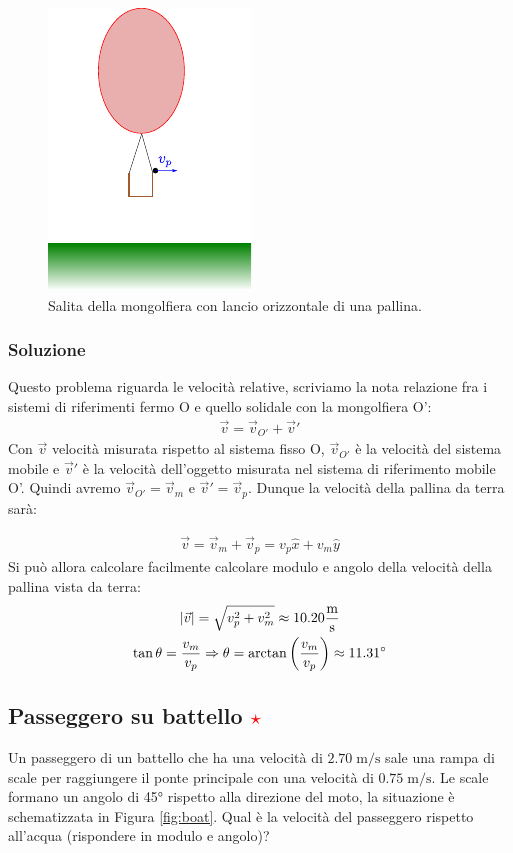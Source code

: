 \documentclass[12pt,a4paper]{book}
\newcommand{\rstar}{ \textcolor{red}{$\star$}}
\begin{document}
\begin{figure}[!ht]
\centering
\includegraphics[scale=1.5]{mongolfiera.pdf}
\caption{Salita della mongolfiera con lancio orizzontale di una pallina. \label{fig:mongolfiera} }
\end{figure}

\subsubsection*{Soluzione}
Questo problema riguarda le velocità relative, scriviamo la nota relazione fra i sistemi di riferimenti fermo O e quello solidale con la mongolfiera O':
%
\begin{gather*}
\vec{v}=\vec{v}_{O'}+\vec{v}'
\end{gather*}
%
Con $\vec{v}$ velocità misurata rispetto al sistema fisso O, $\vec{v}_{O'}$ è la velocità del sistema mobile e $\vec{v}'$ è la velocità dell'oggetto misurata nel sistema di riferimento mobile O'. Quindi avremo $\vec{v}_{O'}=\vec{v}_{m}$ e $\vec{v}'=\vec{v}_{p}$. Dunque la velocità della pallina da terra sarà:

%
\begin{gather*}
\vec{v}=\vec{v}_{m}+\vec{v}_{p}=v_p\hat{x}+v_m\hat{y}
\end{gather*}
%
Si può allora calcolare facilmente calcolare modulo e angolo della velocità della pallina vista da terra:
%
\begin{gather*}
\qty|\vec{v}|=\sqrt{v_p^2+v_m^2}\approx 10.20 \frac{\text{m}}{\text{s}}\\
\tan\theta=\frac{v_m}{v_p} \Rightarrow \theta=\arctan\qty(\frac{v_m}{v_p})\approx 11.31 \degree
\end{gather*}
%

\subsection{Passeggero su battello \rstar}
Un passeggero di un battello che ha una velocità di $2.70\;\text{m/s}$ sale una rampa di scale per raggiungere il ponte principale con una velocità di $0.75\;\text{m/s}$. Le scale formano un angolo di 45° rispetto alla direzione del moto, la situazione è schematizzata in Figura \ref{fig:boat}. Qual è la velocità del passeggero rispetto all'acqua (rispondere in modulo e angolo)?
\end{document}
